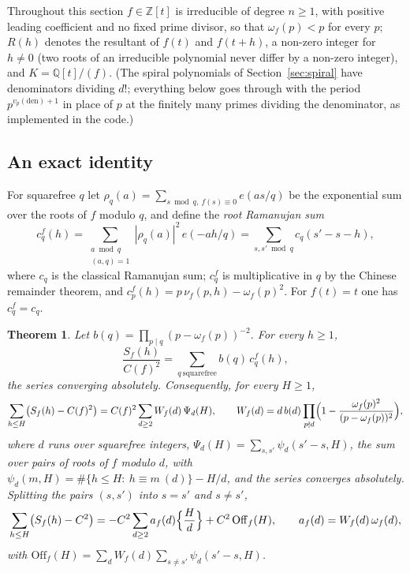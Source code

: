 \documentclass[11pt,a4paper]{article}
\newtheorem{theorem}{Theorem}
\theoremstyle{remark}\newtheorem{remark}[theorem]{Remark}
\newcommand{\Z}{\mathbb{Z}}
\newcommand{\Q}{\mathbb{Q}}
\begin{document}
Throughout this section $f\in\Z[t]$ is irreducible of degree $n\ge1$, with positive leading
coefficient and no fixed prime divisor, so that $\omega_f(p)<p$ for every $p$; $R(h)$ denotes the
resultant of $f(t)$ and $f(t+h)$, a non-zero integer for $h\ne0$ (two roots of an irreducible
polynomial never differ by a non-zero integer), and $K=\Q[t]/(f)$. (The spiral polynomials of
Section~\ref{sec:spiral} have denominators dividing $d!$; everything below goes through with the
period $p^{v_p(\mathrm{den})+1}$ in place of $p$ at the finitely many primes dividing the denominator,
as implemented in the code.)

\subsection{An exact identity}\label{sec:heur}

For squarefree $q$ let $\rho_q(a)=\sum_{s\bmod q,\ f(s)\equiv0}e(as/q)$ be the exponential sum over the
roots of $f$ modulo $q$, and define the \emph{root Ramanujan sum}
\[
c^f_q(h)=\sum_{\substack{a\bmod q\\(a,q)=1}}|\rho_q(a)|^2\,e(-ah/q)=\sum_{s,s'\bmod q}c_q(s'-s-h),
\]
where $c_q$ is the classical Ramanujan sum; $c^f_q$ is multiplicative in $q$ by the Chinese remainder
theorem, and $c^f_p(h)=p\,\nu_f(p,h)-\omega_f(p)^2$. For $f(t)=t$ one has $c^f_q=c_q$.

\begin{theorem}\label{thm:expansion}
Let $b(q)=\prod_{p\mid q}(p-\omega_f(p))^{-2}$. For every $h\ge1$,
\begin{equation}\label{eq:expansion}
\frac{S_f(h)}{C(f)^2}=\sum_{q\ \mathrm{squarefree}}b(q)\,c^f_q(h),
\end{equation}
the series converging absolutely. Consequently, for every $H\ge1$,
\begin{equation}\label{eq:identity}
\sum_{h\le H}\bigl(S_f(h)-C(f)^2\bigr)=C(f)^2\sum_{d\ge2}W_f(d)\,\Psi_d(H),\qquad
W_f(d)=d\,b(d)\prod_{p\nmid d}\Bigl(1-\frac{\omega_f(p)^2}{(p-\omega_f(p))^2}\Bigr),
\end{equation}
where $d$ runs over squarefree integers,
$\Psi_d(H)=\sum_{s,s'}\psi_d(s'-s,H)$, the sum over pairs of roots of $f$ modulo $d$, with
$\psi_d(m,H)=\#\{h\le H:\ h\equiv m\ (d)\}-H/d$, and the series converges absolutely.
Splitting the pairs $(s,s')$ into $s=s'$ and $s\ne s'$,
\begin{equation}\label{eq:split}
\sum_{h\le H}\bigl(S_f(h)-C^2\bigr)=-C^2\sum_{d\ge2}a_f(d)\Bigl\{\frac Hd\Bigr\}+C^2\,\mathrm{Off}_f(H),
\qquad a_f(d)=W_f(d)\,\omega_f(d),
\end{equation}
with $\mathrm{Off}_f(H)=\sum_{d}W_f(d)\sum_{s\ne s'}\psi_d(s'-s,H)$.
\end{theorem}
\end{document}
